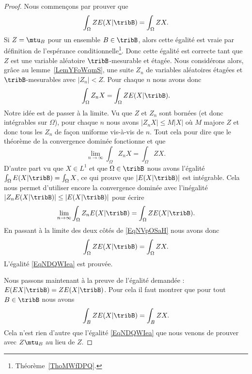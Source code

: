 \begin{proof}
	Nous commençons par prouver que
	\begin{equation}    \label{EqNDQWIea}
		\int_{\Omega}ZE(X|\tribB)=\int_{\Omega}ZX.
	\end{equation}
	Si \( Z=\mtu_B\) pour un ensemble \( B\in\tribB\), alors cette égalité est vraie par définition de l'espérance conditionnelle\footnote{Théorème~\ref{ThoMWfDPQ}.}. Donc cette égalité est correcte tant que \( Z\) est une variable aléatoire \( \tribB\)-mesurable et étagée. Nous considérons alors, grâce au lemme~\ref{LemYFoWqmS}, une suite \( Z_n\) de variables aléatoires étagées et \( \tribB\)-mesurables avec \( | Z_n |<Z\). Pour chaque \( n\) nous avons donc
	\begin{equation}    \label{EqNVpOSaH}
		\int_{\Omega}Z_nX=\int_{\Omega}ZE(X|\tribB).
	\end{equation}
	Notre idée est de passer à la limite. Vu que \( Z\) et \( Z_n\) sont bornées (et donc intégrables sur \( \Omega\)), pour chaque \( n\) nous avons \( | Z_nX |\leq M| X |\) où \( M\) majore \( Z\) et donc tous les \( Z_n\) de façon uniforme vis-à-vis de \( n\). Tout cela pour dire que le théorème de la convergence dominée fonctionne et que
	\begin{equation}
		\lim_{n\to \infty} \int_{\Omega}Z_nX=\int_{\Omega}ZX.
	\end{equation}
	D'autre part vu que \( X\in L^1\) et que \( \Omega\in\tribB\) nous avons l'égalité \( \int_{\Omega}E(X|\tribB)=\int_{\Omega}X\), ce qui prouve que \( | E(X|\tribB) | \) est intégrable. Cela nous permet d'utiliser encore la convergence dominée avec l'inégalité \( | Z_nE(X|\tribB) |\leq | E(X|\tribB) |\) pour écrire
	\begin{equation}
		\lim_{n\to \infty} \int_{\Omega}Z_nE(X|\tribB)=\int_{\Omega}ZE(X|\tribB).
	\end{equation}
	En passant à la limite des deux côtés de \eqref{EqNVpOSaH} nous avons donc
	\begin{equation}
		\int_{\Omega}ZE(X|\tribB)=\int_{\Omega}ZX.
	\end{equation}
	L'égalité \eqref{EqNDQWIea} est prouvée.

	Nous passons maintenant à la preuve de l'égalité demandée : \( E(EX|\tribB)=ZE(X|\tribB)\). Pour cela il faut montrer que pour tout \( B\in\tribB\) nous avons
	\begin{equation}
		\int_{B}ZE(X|\tribB)=\int_BZX.
	\end{equation}
	Cela n'est rien d'autre que l'égalité \eqref{EqNDQWIea} que nous venons de prouver avec \( Z\mtu_{B}\) au lieu de \( Z\).
\end{proof}

